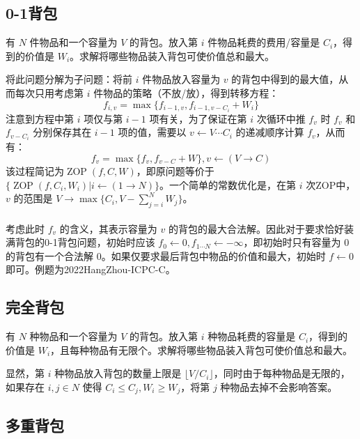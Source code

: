 \documentclass[12pt,a4paper]{article}
\begin{document}
\subsection{0-1背包}
\begin{mdframed}[leftline=true, linewidth=2pt, linecolor=gray]
	有 $N$ 件物品和一个容量为 $V$ 的背包。放入第 $i$ 件物品耗费的费用/容量是 $C_i$，得到的价值是 $W_i$。求解将哪些物品装入背包可使价值总和最大。
\end{mdframed}
将此问题分解为子问题：将前 $i$ 件物品放入容量为 $v$ 的背包中得到的最大值，从而每次只用考虑第 $i$ 件物品的策略（不放/放），得到转移方程：
\begin{equation*}
	\displaystyle f_{i,v}=\max{\{f_{i-1,v}, f_{i-1,v-C_i}+W_i\}}
\end{equation*}
注意到方程中第 $i$ 项仅与第 $i-1$ 项有关，为了保证在第 $i$ 次循环中推 $f_v$ 时 $f_v$ 和 $f_{v-C_i}$ 分别保存其在 $i-1$ 项的值，需要以 $v\leftarrow V\cdots C_i$ 的递减顺序计算 $f_v$，从而有：
\begin{equation*}
	\displaystyle f_{v}=\max{\{f_{v}, f_{v-C}+W\}}, v\leftarrow (V\rightarrow C)
\end{equation*}
该过程简记为$\operatorname{ZOP}(f, C, W)$，即原问题等价于 $\{\operatorname{ZOP}(f, C_i,W_i)|i\leftarrow(1\rightarrow N)\}$。一个简单的常数优化是，在第 $i$ 次ZOP中，$v$ 的范围是 $\displaystyle V\rightarrow \max{\{C_i, V-\sum_{j=i}^{N}W_j\}}$。\\\\
考虑此时 $f_v$ 的含义，其表示容量为 $v$ 的背包的最大合法解。因此对于要求恰好装满背包的0-1背包问题，初始时应该 $f_0\leftarrow0,f_{1\cdots N}\leftarrow-\infty$，即初始时只有容量为 $0$ 的背包有一个合法解 $0$。如果仅要求最后背包中物品的价值和最大，初始时 $f\leftarrow0$ 即可。例题为2022HangZhou-ICPC-C。

\subsection{完全背包}
\begin{mdframed}[leftline=true, linewidth=2pt, linecolor=gray]
	有 $N$ 种物品和一个容量为 $V$ 的背包。放入第 $i$ 种物品耗费的容量是 $C_i$，得到的价值是 $W_i$，且每种物品有无限个。求解将哪些物品装入背包可使价值总和最大。
\end{mdframed}
显然，第 $i$ 种物品放入背包的数量上限是 $\displaystyle\lfloor V/C_i\rfloor$，同时由于每种物品是无限的，如果存在 $i,j\in N$ 使得 $C_i\le C_j,W_i\ge W_j$，将第 $j$ 种物品去掉不会影响答案。

\subsection{多重背包}
\end{document}
